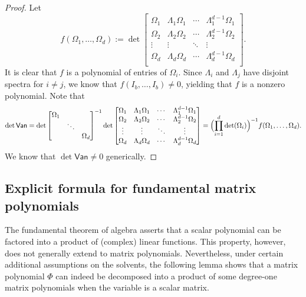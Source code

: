 \documentclass{article}
\newcommand{\defi}{:=}
\newcommand{\van}{\mathsf{Van}}
\begin{document}
\begin{proof}
    Let
    \begin{equation*}
        f(\Omega_{1},\dotsc,\Omega_{d})\defi \det \begin{bmatrix}
        \Omega_{1} & \Lambda_{1}\Omega_{1} & \cdots & \Lambda_{1}^{d-1}\Omega_{1}\\ 
        \Omega_{2} & \Lambda_{2}\Omega_{2} & \cdots & \Lambda_{2}^{d-1}\Omega_{2}\\  
        \vdots & \vdots & \ddots & \vdots \\
        \Omega_{d} & \Lambda_{d}\Omega_{d} & \cdots & \Lambda_{d}^{d-1}\Omega_{d}\\ 
    \end{bmatrix}.
    \end{equation*}
    It is clear that $f$ is a polynomial of entries of $\Omega_{i}$. Since $\Lambda_{i}$ and $\Lambda_{j}$ have disjoint spectra for $i\neq j$, we know that $f(I_{b},\dotsc,I_{b})\neq 0$, yielding that $f$ is a nonzero polynomial. Note that 
    \begin{equation*}
        \det\van = \det \begin{bmatrix}
            \Omega_{1}&&\\ 
            &\ddots &\\ 
            &&\Omega_{d}
        \end{bmatrix}^{-1}
        \det \begin{bmatrix}
        \Omega_{1} & \Lambda_{1}\Omega_{1} & \cdots & \Lambda_{1}^{d-1}\Omega_{1}\\ 
        \Omega_{2} & \Lambda_{2}\Omega_{2} & \cdots & \Lambda_{2}^{d-1}\Omega_{2}\\  
        \vdots & \vdots & \ddots & \vdots \\
        \Omega_{d} & \Lambda_{d}\Omega_{d} & \cdots & \Lambda_{d}^{d-1}\Omega_{d}\\ 
    \end{bmatrix}
    =\Bigl(\prod_{i=1}^{d}\det(\Omega_{i})\Bigr)^{-1}f(\Omega_{1},\dotsc,\Omega_{d}).   
    \end{equation*}
    We know that $\det \van\neq 0$ generically.
\end{proof}

\subsection{Explicit formula for fundamental matrix polynomials}


The fundamental theorem of algebra asserts that a scalar polynomial can be factored into a product of (complex) linear functions. This property, however, does not generally extend to matrix polynomials. Nevertheless, under certain additional assumptions on the solvents, the following lemma shows that a matrix polynomial $\Phi$ can indeed be decomposed into a product of some degree-one matrix polynomials when the variable is a scalar matrix.
\end{document}
